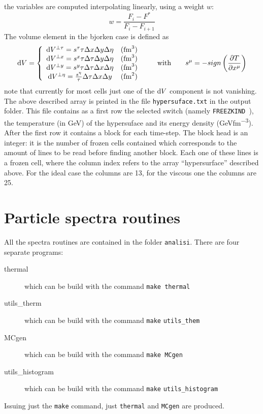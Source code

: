 the variables are computed interpolating linearly, using a weight $w$:
$$w=\dfrac{F_i-F^*}{F_i-F_{i+1}}$$
The volume element in the bjorken case is defined as
\[
\de V=\left\lbrace
\begin{array}{cc}
\de V^{\perp \tau}= s^\tau \tau \Delta x \Delta y \Delta \eta &(\si{fm^3})\\
\de V^{\perp x}= s^x \tau \Delta \tau \Delta y \Delta \eta &(\si{fm^3})\\
\de V^{\perp y}= s^y \tau \Delta \tau \Delta x \Delta \eta &(\si{fm^3})\\
\de V^{\perp \eta}= \frac{s^\eta}{\tau} \Delta \tau \Delta x \Delta y 
&(\si{fm^2})\\
\end{array}\right.\qquad\mbox{with}\qquad
s^\mu=-sign\left(\dfrac{\partial T}{\partial x^\mu}\right)
\]
note that currently for most cells just one of the $\de V$ component is not
vanishing. \\


The above described array is printed in the file {\tt hypersuface.txt} in the 
output folder. This file contains as a first row the selected switch (namely 
{\tt FREEZKIND }), the temperature (in GeV) of the hypersuface and its energy 
density (\si{GeVfm^{-3}}). 
After the first row it contains a block for each time-step. The block head is an 
integer: it is the number of frozen cells contained which corresponds to the 
amount of lines to be read before finding another block. Each one of these lines 
is a frozen cell, where the column index refers to the array ``hypersurface''
described above. For the ideal case the columns are 13, for the viscous one the 
columns are 25.





\section{Particle spectra routines}
All the spectra routines are contained in the folder {\tt analisi}.
There are four separate programs: 
\begin{description}
 \item[thermal] which can be build with the command {\tt make thermal}
 \item[utils\_therm]  which can be build with the command {\tt make} {\tt utils\_them}
 \item[MCgen]  which can be build with the command {\tt make MCgen}
 \item[utils\_histogram]  which can be build with the command {\tt make}  {\tt utils\_histogram}
\end{description}
Issuing just the {\tt make} command, just {\tt thermal} and {\tt MCgen} are produced.

